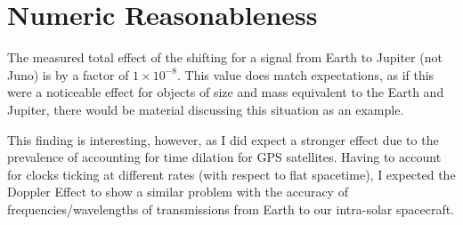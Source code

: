 \documentclass[]{report}
\begin{document}
  \section{Numeric Reasonableness}
  The measured total effect of the shifting for a signal from Earth to Jupiter (not Juno) is by a factor of $1\times10^{-8}$. This value does match expectations, as if this were a noticeable effect for objects of size and mass equivalent to the Earth and Jupiter, there would be material discussing this situation as an example.

  This finding is interesting, however, as I did expect a stronger effect due to the prevalence of accounting for time dilation for GPS satellites. Having to account for clocks ticking at different rates (with respect to flat spacetime), I expected the Doppler Effect to  show a similar problem with the accuracy of frequencies/wavelengths of transmissions from Earth to our intra-solar spacecraft.
\end{document}
